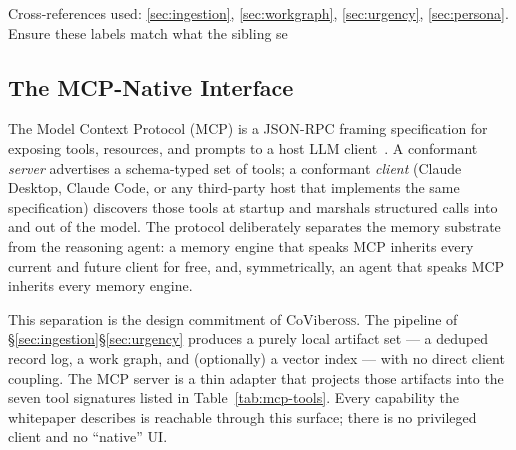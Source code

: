
Cross-references used: \ref{sec:ingestion}, \ref{sec:workgraph}, \ref{sec:urgency}, \ref{sec:persona}. Ensure these labels match what the sibling se

\subsection{The MCP-Native Interface}
\label{sec:mcp}

The Model Context Protocol (MCP) is a JSON-RPC framing specification for exposing tools, resources, and prompts to a host LLM client~\cite{TODO-mcp-spec}. A conformant \emph{server} advertises a schema-typed set of tools; a conformant \emph{client} (Claude Desktop, Claude Code, or any third-party host that implements the same specification) discovers those tools at startup and marshals structured calls into and out of the model. The protocol deliberately separates the memory substrate from the reasoning agent: a memory engine that speaks MCP inherits every current and future client for free, and, symmetrically, an agent that speaks MCP inherits every memory engine.

This separation is the design commitment of CoViber\Hyphdash{}\textsc{oss}. The pipeline of \S\ref{sec:ingestion}\Hyphdash\S\ref{sec:urgency} produces a purely local artifact set --- a deduped record log, a work graph, and (optionally) a vector index --- with no direct client coupling. The MCP server is a thin adapter that projects those artifacts into the seven tool signatures listed in Table~\ref{tab:mcp-tools}. Every capability the whitepaper describes is reachable through this surface; there is no privileged client and no ``native'' UI.

